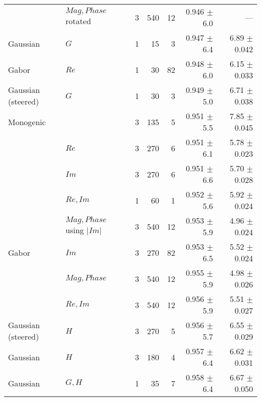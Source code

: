 \begin{tabularx}{\linewidth}{p{3cm} p{3cm} r r r r r}
\dtcwt{}& $Mag,Phase$ rotated       & 3 &    540    & 12     & 0.946 $\pm$ 6.0     & --- \\

Gaussian& $G$                       & 1 &     15    &  3     & 0.947 $\pm$ 6.4 & 6.89 $\pm$ 0.042   \\

Gabor   & $Re$                      & 1 &     30    & 82     & 0.948 $\pm$ 6.0   & 6.15 $\pm$ 0.033 \\

Gaussian (steered)& $G$             & 1 &     30    &  3     & 0.949 $\pm$ 5.0   & 6.71 $\pm$ 0.038 \\

\multicolumn{2}{l}{Monogenic}       & 3 &    135    &  5     & 0.951 $\pm$ 5.5     & 7.85 $\pm$ 0.045 \\

\dtcwt{}& $Re$                      & 3 &    270    &  6     & 0.951 $\pm$ 6.1   & 5.78 $\pm$ 0.023 \\

\dtcwt{}& $Im$                      & 3 &    270    &  6     & 0.951 $\pm$ 6.6   & 5.70 $\pm$ 0.028 \\

\dtcwt{}& $Re,Im$                   & 1 &     60    &  1     & 0.952 $\pm$ 5.6   &  5.92 $\pm$ 0.024 \\

\dtcwt{}& $Mag,Phase$ using $|Im|$  & 3 &    540    & 12     & 0.953 $\pm$ 5.9     & 4.96 $\pm$  0.024 \\

Gabor   & $Im$                      & 3 &    270    & 82     & 0.953 $\pm$ 6.5   & 5.52 $\pm$ 0.024 \\

\dtcwt{}& $Mag,Phase$               & 3 &    540    & 12     & 0.955 $\pm$ 5.9     & 4.98 $\pm$  0.026 \\

\dtcwt{}& $Re,Im$                   & 3 &    540    & 12     & 0.956 $\pm$ 5.9   & 5.51 $\pm$ 0.027 \\

Gaussian (steered)& $H$             & 3 &    270    &  5     & 0.956 $\pm$ 5.7   & 6.55 $\pm$ 0.029 \\

Gaussian& $H$                       & 3 &    180    &  4     & 0.957 $\pm$ 6.4 & 6.62 $\pm$ 0.031 \\

Gaussian& $G, H$                    & 1 &     35    &  7     & 0.958 $\pm$ 6.4 & 6.67 $\pm$ 0.050   \\


\end{tabularx}
